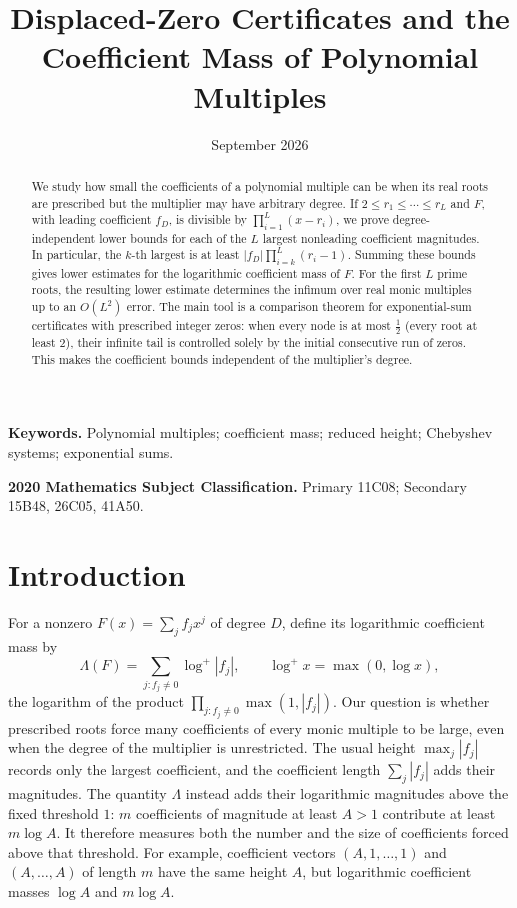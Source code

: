 \documentclass[11pt]{article}
\title{Displaced-Zero Certificates and the Coefficient Mass of Polynomial Multiples}
\author{\shortstack{Bangyen Pham\\
\small Independent Researcher\\
\small\href{mailto:bangyenp@gmail.com}{\texttt{bangyenp@gmail.com}}\\
\small\href{https://orcid.org/0009-0006-9928-2088}{ORCID: 0009-0006-9928-2088}}}
\date{September 2026}
\begin{document}
\maketitle

\begin{abstract}
We study how small the coefficients of a polynomial multiple can be when its
real roots are prescribed but the multiplier may have arbitrary degree.  If
$2\le r_1\le\cdots\le r_L$ and $F$, with leading coefficient $f_D$, is divisible by
$\prod_{i=1}^L(x-r_i)$, we prove degree-independent lower bounds for each of
the $L$ largest nonleading coefficient magnitudes.  In particular, the
$k$-th largest is at least
$|f_D|\prod_{i=k}^L(r_i-1)$.  Summing these bounds gives lower estimates for
the logarithmic coefficient mass of $F$.  For the first $L$ prime roots, the
resulting lower estimate determines the infimum over real monic multiples up to an $O(L^2)$ error.
The main tool is a comparison theorem for exponential-sum certificates with
prescribed integer zeros: when every node is at most $\frac12$ (every root at
least $2$), their infinite tail is controlled solely by the initial
consecutive run of zeros.  This makes the coefficient bounds
independent of the multiplier's degree.
\end{abstract}

\noindent\textbf{Keywords.} Polynomial multiples; coefficient mass; reduced
height; Chebyshev systems; exponential sums.

\noindent\textbf{2020 Mathematics Subject Classification.} Primary 11C08;
Secondary 15B48, 26C05, 41A50.

\section{Introduction}

For a nonzero $F(x)=\sum_jf_jx^j$ of degree $D$, define its logarithmic
coefficient mass by
\[
  \Lambda(F)=\sum_{j:f_j\ne0}\log^+|f_j|,
  \qquad \log^+x=\max(0,\log x),
\]
the logarithm of the product
$\prod_{j:f_j\ne0}\max(1,|f_j|)$.  Our question is whether prescribed roots
force many coefficients of every monic multiple to be large, even when the
degree of the multiplier is unrestricted.  The usual height
$\max_j|f_j|$ records only the largest coefficient, and the coefficient length
$\sum_j|f_j|$ adds their magnitudes.  The quantity $\Lambda$ instead adds
their logarithmic magnitudes above the fixed threshold $1$: $m$ coefficients
of magnitude at least $A>1$ contribute at least $m\log A$.  It therefore
measures both the number and the size of coefficients forced above that
threshold.  For example, coefficient vectors $(A,1,\ldots,1)$ and
$(A,\ldots,A)$ of length $m$ have the same height $A$, but logarithmic
coefficient masses $\log A$ and $m\log A$.
\end{document}
